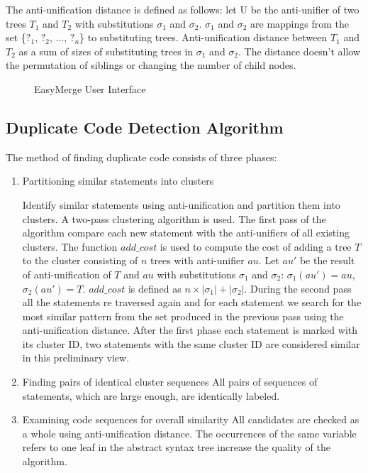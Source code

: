 \documentclass{acm_proc_article-sp}
\begin{document}
The anti-unification distance is defined as follows: let U be the anti-unifier of two trees $T_{1}$ and $T_{2}$ with substitutions $\sigma_{1}$ and $\sigma_{2}$. $\sigma_{1}$ and $\sigma_{2}$ are mappings from the set \{$?_{1}$, $?_{2}$, ..., $?_{n}$\} to substituting trees. Anti-unification distance between $T_{1}$ and $T_{2}$ as a sum of sizes of substituting trees in $\sigma_{1}$ and $\sigma_{2}$. The distance doesn't allow the permutation of siblings or changing the number of child nodes.

\begin{figure*}
\centering
{}
\caption{EasyMerge User Interface}
\end{figure*}

\subsection{Duplicate Code Detection Algorithm}
The method of finding duplicate code consists of three phases:
\begin{enumerate}[step 1]

    \item Partitioning similar statements into clusters
    
    Identify similar statements using anti-unification and partition them into clusters. A two-pass clustering algorithm is used. The first pass of the algorithm compare each new statement with the anti-unifiers of all existing clusters. The function $add\_cost$ is used to compute the cost of adding a tree $T$ to the cluster consisting of $n$ trees with anti-unifier $au$. Let $au'$ be the result of anti-unification of $T$ and $au$ with substitutions $\sigma_{1}$ and $\sigma_{2}$: $\sigma_{1}(au') = au$, $\sigma_{2}(au') = T$. $add\_cost$ is defined as $n \times |\sigma_{1}| + |\sigma_{2}|$. During the second pass all the statements re traversed again and for each statement we search for the most similar pattern from the set produced in the previous pass using the anti-unification distance. After the first phase each statement is marked with its cluster ID, two statements with the same cluster ID are considered similar in this preliminary view.

    \item Finding pairs of identical cluster sequences
    All pairs of sequences of statements, which are large enough, are identically labeled.
    
    \item Examining code sequences for overall similarity
    All candidates are checked as a whole using anti-unification distance. The occurrences of the same variable refers to one leaf in the abstract syntax tree increase the quality of the algorithm.
\end{enumerate}
\end{document}
